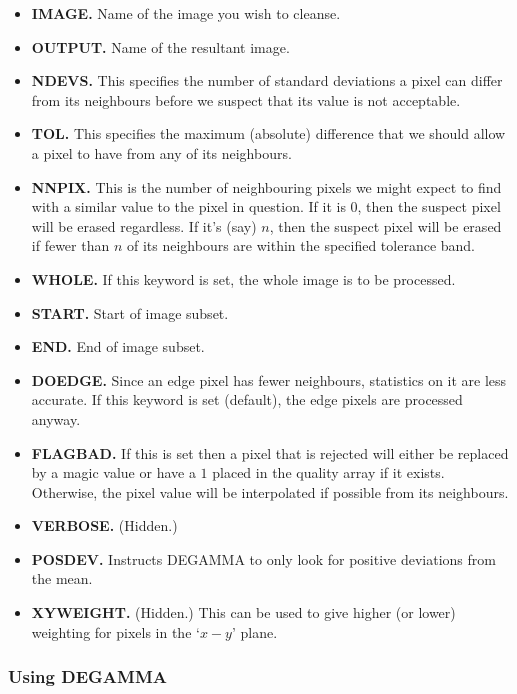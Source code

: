 \begin{itemize}
\item {\bf IMAGE.} Name of the image you wish to cleanse.
\item {\bf OUTPUT.} Name of the resultant image.
\item {\bf NDEVS.} This specifies the number of standard deviations a pixel can
differ from its neighbours before we suspect that its value is not acceptable.
\item {\bf TOL.} This specifies the maximum (absolute) difference that we should
allow a pixel to have from any of its neighbours.
\item {\bf NNPIX.} This is the number of neighbouring pixels we might expect to
find with a similar value to the pixel in question. If it is 0, then the
suspect pixel will be erased regardless. If it's (say) $n$, then the suspect
pixel will be erased if fewer than $n$ of its neighbours are within the
specified tolerance band.
\item {\bf WHOLE.} If this keyword is set, the whole image is to be processed.
\item  {\bf START.} Start of image subset.
\item {\bf END.} End of image subset.
\item {\bf DOEDGE.} Since an edge pixel has fewer neighbours, statistics on it
are less accurate. If this keyword is set (default), the edge pixels are
processed anyway.
\item {\bf FLAGBAD.} If this is set then a pixel that is rejected will either
be replaced by a magic value or have a $1$ placed in the quality array if it
exists. Otherwise, the pixel value will be interpolated if possible from its
neighbours.
\item {\bf VERBOSE.} (Hidden.)
\item {\bf POSDEV.} Instructs DEGAMMA to only look for positive deviations from
the mean.
\item {\bf XYWEIGHT.} (Hidden.) This can be used to give higher (or lower)
weighting for pixels in the `$x-y$' plane.
\end{itemize}

\subsubsection{Using DEGAMMA}

